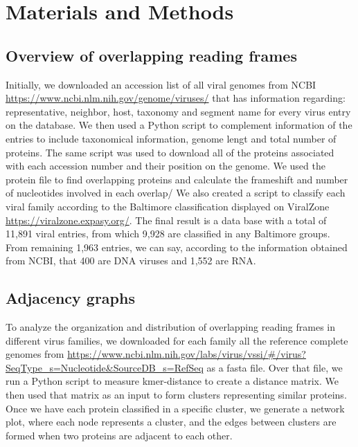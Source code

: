 \documentclass[12pt]{article}
\begin{document}
\section{Materials and Methods}
\subsection{Overview of overlapping reading frames}
Initially, we downloaded an accession list of all viral genomes from NCBI \url{https://www.ncbi.nlm.nih.gov/genome/viruses/} that has information regarding: representative, neighbor, host, taxonomy and segment name for every virus entry on the database. 
We then used a Python script to complement information of the entries to include taxonomical information, genome lengt and total number of proteins. 
The same script was used to download all of the proteins associated with each accession number and their position on the genome. 
We used the protein file to find overlapping proteins and calculate the frameshift and number of nucleotides involved in each overlap/ 
We also created a script to classify each viral family according to the Baltimore classification displayed on ViralZone \url{https://viralzone.expasy.org/}.
The final result is a data base with a total of 11,891 viral entries, from which 9,928 are classified in any Baltimore groups. 
From remaining 1,963 entries, we can say, according to the information obtained from NCBI, that 400 are DNA viruses and 1,552 are RNA. 


\subsection{Adjacency graphs}
To analyze the organization and distribution of overlapping reading frames in different virus families, we downloaded for each family all the reference complete genomes from \url{https://www.ncbi.nlm.nih.gov/labs/virus/vssi/#/virus?SeqType_s=Nucleotide&SourceDB_s=RefSeq} as a fasta file. 
Over that file, we run a Python script to measure kmer-distance to create a distance matrix.
We then used that matrix as an input to form clusters representing similar proteins. 
Once we have each protein classified in a specific cluster, we generate a network plot, where each node represents a cluster, and the edges between clusters are formed when two proteins are adjacent to each other. 



\newpage


\end{document}
